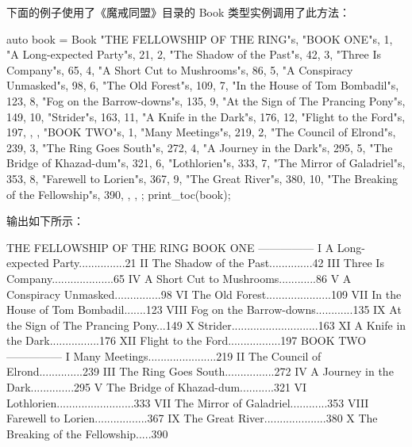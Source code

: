 下面的例子使用了《魔戒同盟》目录的 Book 类型实例调用了此方法：

\begin{cpp}
auto book = Book
{
    "THE FELLOWSHIP OF THE RING"s,
    {
        {
            "BOOK ONE"s,
            {
                {1, "A Long-expected Party"s, 21},
                {2, "The Shadow of the Past"s, 42},
                {3, "Three Is Company"s, 65},
                {4, "A Short Cut to Mushrooms"s, 86},
                {5, "A Conspiracy Unmasked"s, 98},
                {6, "The Old Forest"s, 109},
                {7, "In the House of Tom Bombadil"s, 123},
                {8, "Fog on the Barrow-downs"s, 135},
                {9, "At the Sign of The Prancing Pony"s, 149},
                {10, "Strider"s, 163},
                {11, "A Knife in the Dark"s, 176},
                {12, "Flight to the Ford"s, 197},
            },
        },
        {
            "BOOK TWO"s,
            {
                {1, "Many Meetings"s, 219},
                {2, "The Council of Elrond"s, 239},
                {3, "The Ring Goes South"s, 272},
                {4, "A Journey in the Dark"s, 295},
                {5, "The Bridge of Khazad-dum"s, 321},
                {6, "Lothlorien"s, 333},
                {7, "The Mirror of Galadriel"s, 353},
                {8, "Farewell to Lorien"s, 367},
                {9, "The Great River"s, 380},
                {10, "The Breaking of the Fellowship"s, 390},
            },
        },
    }
};
print_toc(book);
\end{cpp}

输出如下所示：

\begin{shell}
THE FELLOWSHIP OF THE RING
BOOK ONE
---------------
   I A Long-expected Party...............21
  II The Shadow of the Past..............42
 III Three Is Company....................65
  IV A Short Cut to Mushrooms............86
   V A Conspiracy Unmasked...............98
  VI The Old Forest.....................109
 VII In the House of Tom Bombadil.......123
VIII Fog on the Barrow-downs............135
  IX At the Sign of The Prancing Pony...149
   X Strider............................163
  XI A Knife in the Dark................176
 XII Flight to the Ford.................197
BOOK TWO
---------------
   I Many Meetings......................219
  II The Council of Elrond..............239
 III The Ring Goes South................272
  IV A Journey in the Dark..............295
   V The Bridge of Khazad-dum...........321
  VI Lothlorien.........................333
 VII The Mirror of Galadriel............353
VIII Farewell to Lorien.................367
  IX The Great River....................380
   X The Breaking of the Fellowship.....390
\end{shell}

